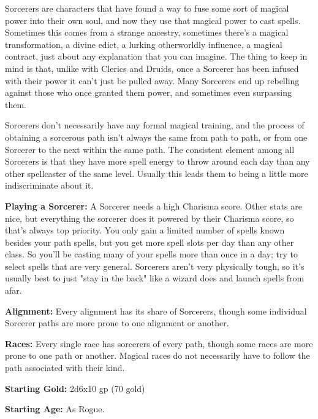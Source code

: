 
Sorcerers are characters that have found a way to fuse some sort of magical power into their own soul, and now they use that magical power to cast spells. Sometimes this comes from a strange ancestry, sometimes there's a magical transformation, a divine edict, a lurking otherworldly influence, a magical contract, just about any explanation that you can imagine. The thing to keep in mind is that, unlike with Clerics and Druids, once a Sorcerer has been infused with their power it can't just be pulled away. Many Sorcerers end up rebelling against those who once granted them power, and sometimes even surpassing them.

Sorcerers don't necessarily have any formal magical training, and the process of obtaining a sorcerous path isn't always the same from path to path, or from one Sorcerer to the next within the same path. The consistent element among all Sorcerers is that they have more spell energy to throw around each day than any other spellcaster of the same level. Usually this leads them to being a little more indiscriminate about it.

\textbf{Playing a Sorcerer:} A Sorcerer needs a high Charisma score. Other stats are nice, but everything the sorcerer does it powered by their Charisma score, so that's always top priority. You only gain a limited number of spells known besides your path spells, but you get more spell slots per day than any other class. So you'll be casting many of your spells more than once in a day; try to select spells that are very general. Sorcerers aren't very physically tough, so it's usually best to just "stay in the back" like a wizard does and launch spells from afar.

\textbf{Alignment:} Every alignment has its share of Sorcerers, though some individual Sorcerer paths are more prone to one alignment or another.

\textbf{Races:} Every single race has sorcerers of every path, though some races are more prone to one path or another. Magical races do not necessarily have to follow the path associated with their kind.

\textbf{Starting Gold:} 2d6x10 gp (70 gold)

\textbf{Starting Age:} As Rogue.

